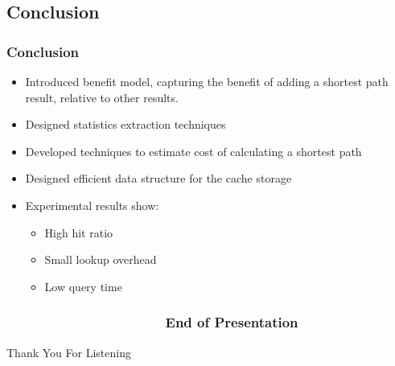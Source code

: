 \subsection{Conclusion} %
\begin{frame}[red] %
\frametitle{Conclusion}

\begin{itemize}
\item Introduced benefit model, capturing the benefit of adding a shortest path result, relative to other results.
\item Designed statistics extraction techniques 
\item Developed techniques to estimate cost of calculating a shortest path
\item Designed efficient data structure for the cache storage
\vspace{2em}
\item Experimental results show:
  \begin{itemize}
  \item High hit ratio
  \item Small lookup overhead
  \item Low query time
  \end{itemize}
\end{itemize}

 
\end{frame}






\begin{frame}[plain] %
\frametitle{\;~~~~~~~~~~~~~~~~~~~~~End of Presentation}

\vspace{9em}
\begin{center}
    \Huge Thank You For Listening
\end{center}
\end{frame}